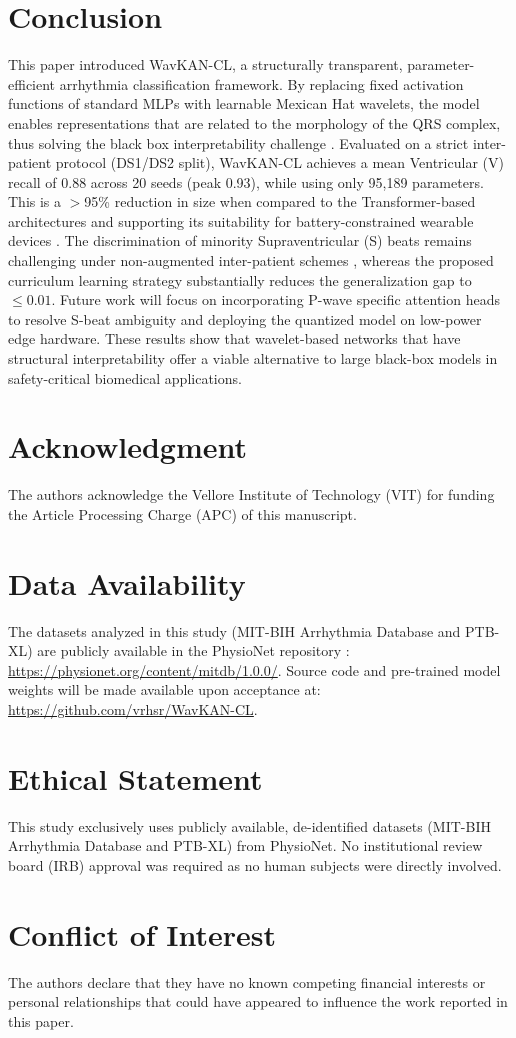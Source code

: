 \documentclass[journal]{IEEEtran}
\begin{document}
\section{Conclusion}
\label{sec:conclusion}
This paper introduced WavKAN-CL, a structurally transparent, parameter-efficient arrhythmia classification framework. By replacing fixed activation functions of standard MLPs with learnable Mexican Hat wavelets, the model enables representations that are related to the morphology of the QRS complex, thus solving the black box interpretability challenge \cite{taleban_explainable_2026}. Evaluated on a strict inter-patient protocol (DS1/DS2 split), WavKAN-CL achieves a mean Ventricular (V) recall of 0.88 across 20 seeds (peak 0.93), while using only 95,189 parameters. This is a $>$95\% reduction in size when compared to the Transformer-based architectures and supporting its suitability for battery-constrained wearable devices \cite{farag_tiny_2023}. The discrimination of minority Supraventricular (S) beats remains challenging under non-augmented inter-patient schemes \cite{bahrami_investigation_2025}, whereas the proposed curriculum learning strategy substantially reduces the generalization gap to $\le 0.01$. Future work will focus on incorporating P-wave specific attention heads to resolve S-beat ambiguity and deploying the quantized model on low-power edge hardware. These results show that wavelet-based networks that have structural interpretability offer a viable alternative to large black-box models in safety-critical biomedical applications.


\section*{Acknowledgment}
The authors acknowledge the Vellore Institute of Technology (VIT) for funding the Article Processing Charge (APC) of this manuscript.

\section*{Data Availability}
The datasets analyzed in this study (MIT-BIH Arrhythmia Database and PTB-XL) are publicly available in the PhysioNet repository \cite{moody_mit-bih_1992}: \url{https://physionet.org/content/mitdb/1.0.0/}. Source code and pre-trained model weights will be made available upon acceptance at: \url{https://github.com/vrhsr/WavKAN-CL}.

\section*{Ethical Statement}
This study exclusively uses publicly available, de-identified datasets (MIT-BIH Arrhythmia Database and PTB-XL) from PhysioNet. No institutional review board (IRB) approval was required as no human subjects were directly involved.

\section*{Conflict of Interest}
The authors declare that they have no known competing financial interests or personal relationships that could have appeared to influence the work reported in this paper.


\end{document}
